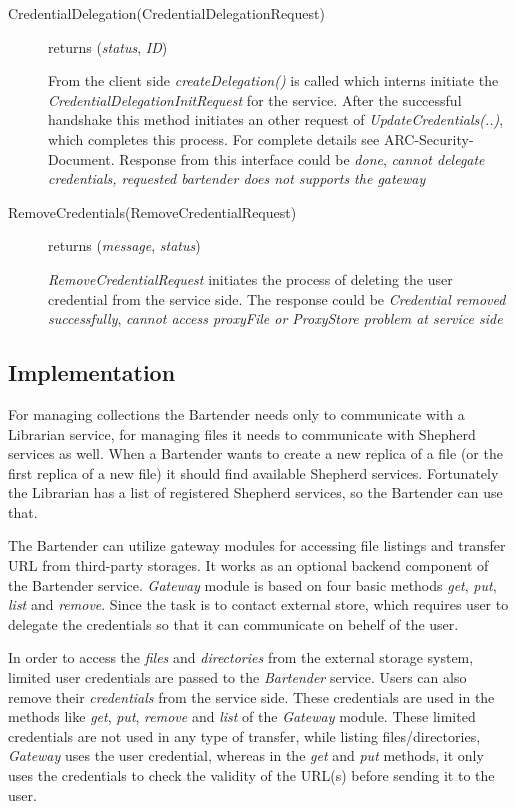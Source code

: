 \documentclass{book}
\begin{document}
\begin{description}
    \item[CredentialDelegation(CredentialDelegationRequest)] returns (\emph{status}, \emph{ID})
    
    From the client side \emph{createDelegation()} is called which interns initiate the \emph{CredentialDelegationInitRequest} for the service. After the successful handshake this method initiates an other request of \emph{UpdateCredentials(..)}, which completes this process. For complete details see ARC-Security-Document. Response from this interface could be \emph{done}, \emph{cannot delegate credentials, requested bartender does not supports the gateway}

    \item[RemoveCredentials(RemoveCredentialRequest)] returns (\emph{message}, \emph{status})

    \emph{RemoveCredentialRequest} initiates the process of deleting the user credential from the service side. The response could be \emph{Credential removed successfully}, \emph{cannot access proxyFile or ProxyStore problem at service side} 

\end{description}


\subsection{Implementation} %

For managing collections the Bartender needs only to communicate with a Librarian service, for managing files it needs to communicate with Shepherd services as well. When a Bartender wants to create a new replica of a file (or the first replica of a new file) it should find available Shepherd services. Fortunately the Librarian has a list of registered Shepherd services, so the Bartender can use that.

The Bartender can utilize gateway modules for accessing file listings and transfer URL from third-party storages. It works as an optional backend component of the Bartender service. \emph{Gateway} module is based on four basic methods \emph{get}, \emph{put}, \emph{list} and \emph{remove}. Since the task is to contact external store, which requires user to delegate the credentials so that it can communicate on behelf of the user.     

In order to access the \emph{files} and \emph{directories} from the external storage system, limited user credentials are passed to the \emph{Bartender} service.  Users can also remove their \emph{credentials} from the service side. These credentials are used in the methods like \emph{get}, \emph{put}, \emph{remove} and \emph{list} of the \emph{Gateway} module. These limited credentials are not used in any type of transfer, while listing files/directories, \emph{Gateway} uses the user credential, whereas in the \emph{get} and \emph{put} methods, it only uses the credentials to check the validity of the URL(s) before sending it to the user.
\end{document}
